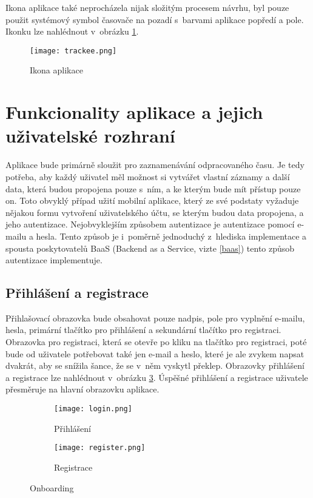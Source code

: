 Ikona aplikace také neprocházela nijak složitým procesem návrhu, byl pouze použit systémový symbol časovače na pozadí s~barvami aplikace popředí a pole. Ikonku lze nahlédnout v~obrázku \ref{fig:app-icon}.

\begin{figure}[h]
	\centering
	\texttt{[image: trackee.png]}
	\caption{Ikona aplikace}
	\label{fig:app-icon}
\end{figure}

\section{Funkcionality aplikace a jejich uživatelské rozhraní}\label{features}

Aplikace bude primárně sloužit pro zaznamenávání odpracovaného času. Je tedy potřeba, aby každý uživatel měl možnost si vytvářet vlastní záznamy a další data, která budou propojena pouze s~ním, a ke kterým bude mít přístup pouze on. Toto obvyklý případ užití mobilní aplikace, který ze své podstaty vyžaduje nějakou formu vytvoření uživatelského účtu, se kterým budou data propojena, a jeho autentizace. Nejobvyklejším způsobem autentizace je autentizace pomocí e-mailu a hesla. Tento způsob je i~poměrně jednoduchý z~hlediska implementace a spousta poskytovatelů BaaS (Backend as a Service, vizte \ref{baas}) tento způsob autentizace implementuje. 

\subsection{Přihlášení a registrace}\label{feature-onboarding}

Přihlašovací obrazovka bude obsahovat pouze nadpis, pole pro vyplnění e-mailu, hesla, primární tlačítko pro přihlášení a sekundární tlačítko pro registraci. Obrazovka pro registraci, která se otevře po kliku na tlačítko pro registraci, poté bude od uživatele potřebovat také jen e-mail a heslo, které je ale zvykem napsat dvakrát, aby se snížila šance, že se v~něm vyskytl překlep. Obrazovky přihlášení a registrace lze nahlédnout v~obrázku \ref{fig:onboarding}. Úspěšné přihlášení a registrace uživatele přesměruje na hlavní obrazovku aplikace.

\begin{figure}[h]
    \centering
    \begin{subfigure}[b]{0.4\textwidth}
		\centering
		\texttt{[image: login.png]}
		\caption{Přihlášení}
		\label{fig:login}
	\end{subfigure}
	\hspace{2cm}
	\begin{subfigure}[b]{0.4\textwidth}
		\centering
		\texttt{[image: register.png]}
		\caption{Registrace}
	\end{subfigure}
	\caption{Onboarding}
	\label{fig:onboarding}
\end{figure}

